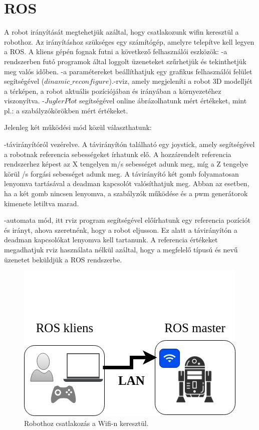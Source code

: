 
\section{ROS}

A robot irányítását megtehetjük azáltal, hogy csatlakozunk wifin keresztül a robothoz. Az irányításhoz szükséges egy számítógép, amelyre telepítve kell legyen a ROS. A kliens gépén fognak futni a következő felhasználói eszközök:
-a rendszerben futó programok által loggolt üzeneteket szűrhetjük és tekinthetjük meg valós időben.
-a paramétereket beállíthatjuk egy grafikus felhasználói felület segítségével ($dinamic\_reconfigure$).-rviz, amely megjeleníti a robot 3D modelljét a térképen, a robot aktuális pozíciójában és irányában a környezetéhez viszonyítva.
-$JuglerPlot$ segítségével online ábrázolhatunk mért értékeket, mint pl.: a szabályzókörökben mért értékeket.

Jelenleg két működési mód közül választhatunk:

	-távirányítóról vezérelve. A távirányítón található egy joystick, amely segítségével a robotnak referencia sebességeket írhatunk elő. A hozzárendelt referencia rendszerhez képest az X tengelyen m/s sebességet adunk meg, míg a Z tengelye körül \degree/s forgási sebességet adunk meg.
A távirányító két gomb folyamatosan lenyomva tartásával a deadman kapcsolót valósíthatjuk meg. Abban az esetben, ha a két gomb nincsen lenyomva, a szabályzók működése és a pwm generátorok kimenete letiltva marad.

	-automata mód, itt rviz program segítségével előírhatunk egy referencia pozíciót és irányt, ahova szeretnénk, hogy a robot eljusson. Ez alatt a távirányítón a deadman kapcsolókat lenyomva kell tartanunk. A referencia értékeket megadhatjuk rviz használata nélkül azáltal, hogy a megfelelő típusú és nevű üzenetet beküldjük a ROS rendszerbe.



\begin{figure}[H]
  \includegraphics{tikz/RobotUserLan.jpg}
  \caption{Robothoz csatlakozás a Wifi-n keresztül.}
  \label{fig:RobotUserLan}
\end{figure}


